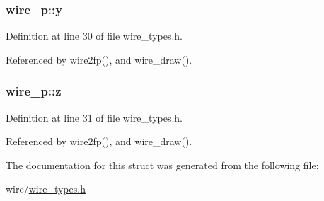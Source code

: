 \subsubsection[{\texorpdfstring{y}{y}}]{ wire\+\_\+p\+::y}\hypertarget{structwire__p_a32b151309922af59db0cafea09e77b67}{}\label{structwire__p_a32b151309922af59db0cafea09e77b67}


Definition at line 30 of file wire\+\_\+types.\+h.



Referenced by wire2fp(), and wire\+\_\+draw().

\subsubsection[{\texorpdfstring{z}{z}}]{ wire\+\_\+p\+::z}\hypertarget{structwire__p_a423cfb83825fc447478c866e4c2f6520}{}\label{structwire__p_a423cfb83825fc447478c866e4c2f6520}


Definition at line 31 of file wire\+\_\+types.\+h.



Referenced by wire2fp(), and wire\+\_\+draw().



The documentation for this struct was generated from the following file\+:\begin{DoxyCompactItemize}
\item 
wire/\hyperlink{wire__types_8h}{wire\+\_\+types.\+h}\end{DoxyCompactItemize}
